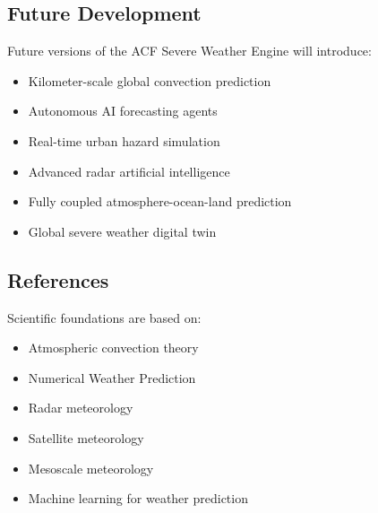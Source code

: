 \subsection{Future Development}

Future versions of the ACF Severe Weather Engine will introduce:

\begin{itemize}

\item Kilometer-scale global convection prediction

\item Autonomous AI forecasting agents

\item Real-time urban hazard simulation

\item Advanced radar artificial intelligence

\item Fully coupled atmosphere-ocean-land prediction

\item Global severe weather digital twin

\end{itemize}



\subsection{References}

Scientific foundations are based on:

\begin{itemize}

\item Atmospheric convection theory

\item Numerical Weather Prediction

\item Radar meteorology

\item Satellite meteorology

\item Mesoscale meteorology

\item Machine learning for weather prediction

\end{itemize}



